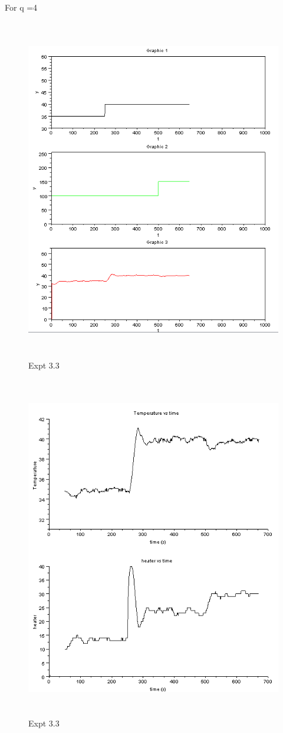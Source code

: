 For q =4
\begin{figure}[H]
  \includegraphics[width=12cm, height=15cm]{mpc/3_3.PNG}
  \caption{Expt 3.3}
\end{figure}
\begin{figure}[H]
  \includegraphics[width=12cm, height=15cm]{mpc/3_3_heater_final.png}
  \caption{Expt 3.3}
\end{figure}



